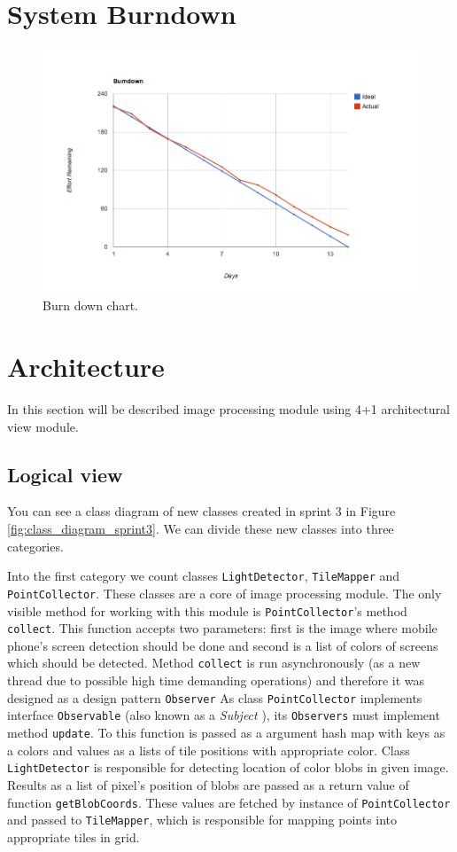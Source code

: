 \section{System Burndown}
\begin{figure}[H]
	\centering
		\includegraphics[width=18cm]{sprint3/BurndownSprint3.png}
	\caption{Burn down chart.}
	\label{fig:Burn3 }
\end{figure}

\section{Architecture}
In this section will be described image processing module using 4+1 architectural view module.

\subsection{Logical view}
You can see a class diagram of new classes created in sprint 3 in Figure \ref{fig:class_diagram_sprint3}. We can divide these new classes into three categories. 

Into the first category we count classes \texttt{LightDetector}, \texttt{TileMapper} and \texttt{PointCollector}. 
These classes are a core of image processing module. 
The only visible method for working with this module is \texttt{PointCollector}'s method \texttt{collect}.
This function accepts two parameters: first is the image where mobile phone's screen detection should be done and second is a list of colors of screens which should be detected. 
Method \texttt{collect} is run asynchronously (as a new thread due to possible high time demanding operations) and therefore it was designed as a design pattern \texttt{Observer}
As class \texttt{PointCollector} implements interface \texttt{Observable} (also known as a \emph{Subject} \cite[p.~326]{Gamma:1995:DPE:186897}), its \texttt{Observers} must implement method \texttt{update}. 
To this function is passed as a argument hash map with keys as a colors and values as a lists of tile positions with appropriate color.
Class \texttt{LightDetector} is responsible for detecting location of color blobs in given image. 
Results as a list of pixel's position of blobs are passed as a return value of function \texttt{getBlobCoords}. 
These values are fetched by instance of \texttt{PointCollector} and passed to \texttt{TileMapper}, which is responsible for mapping points into appropriate tiles in grid.

